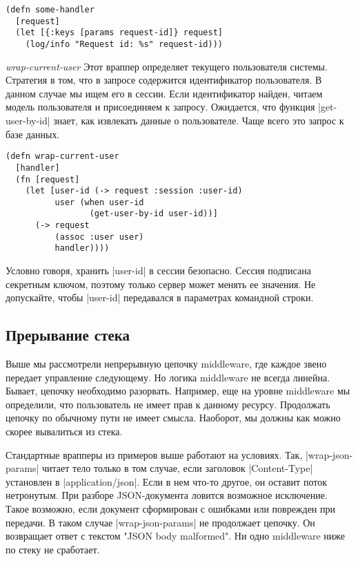 \begin{verbatim}
(defn some-handler
  [request]
  (let [{:keys [params request-id]} request]
    (log/info "Request id: %s" request-id)))
\end{verbatim}

\emph{wrap-current-user} Этот враппер определяет текущего пользователя
системы. Стратегия в том, что в запросе содержится идентификатор пользователя. В
данном случае мы ищем его в сессии. Если идентификатор найден, читаем модель
пользователя и присоединяем к запросу. Ожидается, что функция
\spverb|get-user-by-id| знает, как извлекать данные о пользователе. Чаще всего
это запрос к базе данных.

\begin{verbatim}
(defn wrap-current-user
  [handler]
  (fn [request]
    (let [user-id (-> request :session :user-id)
          user (when user-id
                 (get-user-by-id user-id))]
      (-> request
          (assoc :user user)
          handler))))
\end{verbatim}

Условно говоря, хранить \spverb|user-id| в сессии безопасно. Сессия подписана секретным
ключом, поэтому только сервер может менять ее значения. Не допускайте, чтобы
\spverb|user-id| передавался в параметрах командной строки.

\subsection{Прерывание стека}

Выше мы рассмотрели непрерывную цепочку middleware, где каждое звено передает
управление следующему. Но логика middleware не всегда линейна. Бывает, цепочку
необходимо разорвать. Например, еще на уровне middleware мы определили, что
пользователь не имеет прав к данному ресурсу. Продолжать цепочку по обычному
пути не имеет смысла. Наоборот, мы должны как можно скорее вывалиться из стека.

Стандартные врапперы из примеров выше работают на условиях. Так,
\spverb|wrap-json-params| читает тело только в том случае, если заголовок
\spverb|Content-Type| установлен в \spverb|application/json|. Если в нем что-то другое, он
оставит поток нетронутым. При разборе JSON-документа ловится возможное
исключение. Такое возможно, если документ сформирован с ошибками или поврежден
при передачи. В таком случае \spverb|wrap-json-params| не продолжает цепочку. Он
возвращает ответ с текстом "JSON body malformed". Ни одно middleware ниже по
стеку не сработает.

